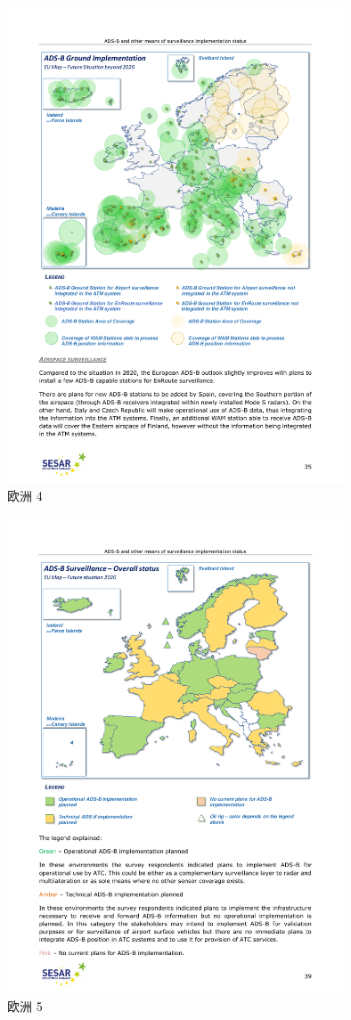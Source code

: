 \begin{figure}[htbp]
\centering
\includegraphics[width=10cm]{pic/20180515-sesar-ads-b-report_35.pdf}
\caption{欧洲 4}
\label{fig:20180515-sesar-ads-b-report_35}
\end{figure}

\begin{figure}[htbp]
\centering
\includegraphics[width=10cm]{pic/20180515-sesar-ads-b-report_39.pdf}
\caption{欧洲 5}
\label{fig:20180515-sesar-ads-b-report_39}
\end{figure}

